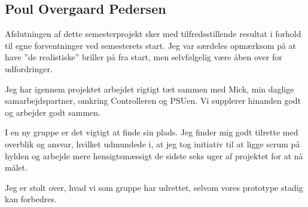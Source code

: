 \subsection*{Poul Overgaard Pedersen}

Afslutningen af dette semesterprojekt sker med tilfredsstillende resultat i forhold til egne forventninger ved semesterets start. Jeg var særdeles opmærksom på at have ''de realistiske'' briller på fra start, men selvfølgelig være åben over for udfordringer. 

Jeg har igennem projektet arbejdet rigtigt tæt sammen med Mick, min daglige samarbejdspartner, omkring Controlleren og PSUen. Vi supplerer hinanden godt og arbejder godt sammen. 

I en ny gruppe er det vigtigt at finde sin plads. Jeg finder mig godt tilrette med overblik og ansvar, hvilket udmundede i, at jeg tog initiativ til at ligge scrum på hylden og arbejde mere hensigtsmæssigt de sidste seks uger af projektet for at nå målet. 

Jeg er stolt over, hvad vi som gruppe har udrettet, selvom vores prototype stadig kan forbedres. 